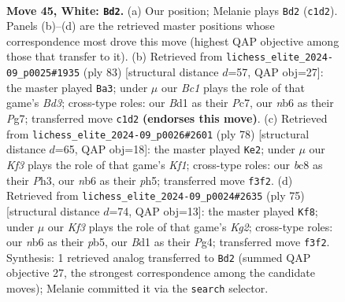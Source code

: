 \documentclass[11pt]{article}
\begin{document}
\clearpage

\begin{figure}[p]\centering
\begin{subfigure}{0.46\textwidth}\centering
\resizebox{\linewidth}{!}{%
\newchessgame
\chessboard[
  setfen={1nb2b2/1p6/1n4k1/pN1p2p1/7p/PP2PK1P/4P3/2BB4 w - - 2 45},
  showmover=false,
  pgfstyle=straightmove, color=movearrow, markmove={c1-d2}
]}
\caption{}
\end{subfigure}\hfill
\begin{subfigure}{0.46\textwidth}\centering
\resizebox{\linewidth}{!}{%
\newchessgame
\chessboard[
  setfen={8/p1p1k1p1/P1nbp2p/4p2P/2P1P3/3NB1P1/5PK1/8 b - - 0 42},
  showmover=false,
  pgfstyle=straightmove, color=movearrow, markmove={d6-a3}
]}
\caption{}
\end{subfigure}
\\[4pt]
\begin{subfigure}{0.46\textwidth}\centering
\resizebox{\linewidth}{!}{%
\newchessgame
\chessboard[
  setfen={1n6/3k4/3bp1p1/1p1p3p/1P1Pp3/4P1PP/N2B1P2/5K2 w - - 0 40},
  showmover=false,
  pgfstyle=straightmove, color=movearrow, markmove={f1-e2}
]}
\caption{}
\end{subfigure}\hfill
\begin{subfigure}{0.46\textwidth}\centering
\resizebox{\linewidth}{!}{%
\newchessgame
\chessboard[
  setfen={8/4npk1/1p2b3/pP1pPp2/P2P1Pp1/2N3P1/3K4/2N5 b - - 3 38},
  showmover=false,
  pgfstyle=straightmove, color=movearrow, markmove={g7-f8}
]}
\caption{}
\end{subfigure}
\caption{\textbf{Move 45, White: \texttt{Bd2}.} (a) Our position; Melanie plays \texttt{Bd2} (\texttt{c1d2}). Panels (b)--(d) are the retrieved master positions whose correspondence most drove this move (highest QAP objective among those that transfer to it). (b) Retrieved from \texttt{lichess\_elite\_2024-09\_p0025\#1935} (ply 83) [structural distance $d$=57, QAP obj=27]: the master played \texttt{Ba3}; under $\mu$ our \emph{Bc1} plays the role of that game's \emph{Bd3}; cross-type roles: our \emph{B}d1 as their \emph{P}c7, our \emph{n}b6 as their \emph{P}g7; transferred move \texttt{c1d2} \textbf{(endorses this move)}. (c) Retrieved from \texttt{lichess\_elite\_2024-09\_p0026\#2601} (ply 78) [structural distance $d$=65, QAP obj=18]: the master played \texttt{Ke2}; under $\mu$ our \emph{Kf3} plays the role of that game's \emph{Kf1}; cross-type roles: our \emph{b}c8 as their \emph{P}h3, our \emph{n}b6 as their \emph{p}h5; transferred move \texttt{f3f2}. (d) Retrieved from \texttt{lichess\_elite\_2024-09\_p0024\#2635} (ply 75) [structural distance $d$=74, QAP obj=13]: the master played \texttt{Kf8}; under $\mu$ our \emph{Kf3} plays the role of that game's \emph{Kg2}; cross-type roles: our \emph{n}b6 as their \emph{p}b5, our \emph{B}d1 as their \emph{P}g4; transferred move \texttt{f3f2}. Synthesis: 1 retrieved analog transferred to \texttt{Bd2} (summed QAP objective 27, the strongest correspondence among the candidate moves); Melanie committed it via the \texttt{search} selector.}
\label{fig:thought-m88}
\end{figure}
\end{document}
